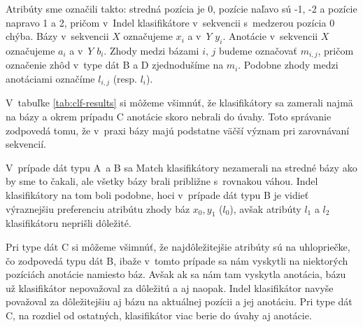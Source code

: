 Atribúty sme označili takto: stredná pozícia je 0, pozície naľavo sú -1, -2 a pozície napravo 1 a 2, pričom v~Indel klasifikátore v~sekvencii s~medzerou pozícia 0 chýba. Bázy v~sekvencii $X$ označujeme $x_i$ a v~$Y$ $y_i$. Anotácie v~sekvencii $X$ označujeme $a_i$ a v~$Y$ $b_i$. Zhody medzi bázami $i,\, j$ budeme označovať $m_{i, j}$, pričom označenie zhôd v~type dát B a D zjednodušíme na $m_i$. Podobne zhody medzi anotáciami označíme $l_{i, j}$ (resp. $l_i$).

V~tabuľke \ref{tab:clf-results} si môžeme všimnúť, že klasifikátory sa zamerali najmä na bázy a okrem prípadu C anotácie skoro nebrali do úvahy.
Toto správanie zodpovedá tomu, že v~praxi bázy majú podstatne väčší význam pri zarovnávaní sekvencií.

V~prípade dát typu A~a B sa Match klasifikátory nezamerali na stredné bázy ako by sme to čakali, ale všetky bázy brali približne s~rovnakou váhou. Indel klasifikátory na tom boli podobne, hoci v~prípade dát typu B je vidieť výraznejšiu preferenciu atribútu zhody báz $x_0, y_1$ ($l_0$), avšak atribúty $l_1$ a $l_2$ klasifikátoru neprišli dôležité.

Pri type dát C si môžeme všimnúť, že najdôležitejšie atribúty sú na uhlopriečke, čo zodpovedá typu dát B, ibaže v~tomto prípade sa nám vyskytli na niektorých pozíciách anotácie namiesto báz.
Avšak ak sa nám tam vyskytla anotácia, bázu už klasifikátor nepovažoval za dôležitú a aj naopak.
Indel klasifikátor navyše považoval za dôležitejšiu aj bázu na aktuálnej pozícii a jej anotáciu. Pri type dát C, na rozdiel od ostatných, klasifikátor viac berie do úvahy aj anotácie.


